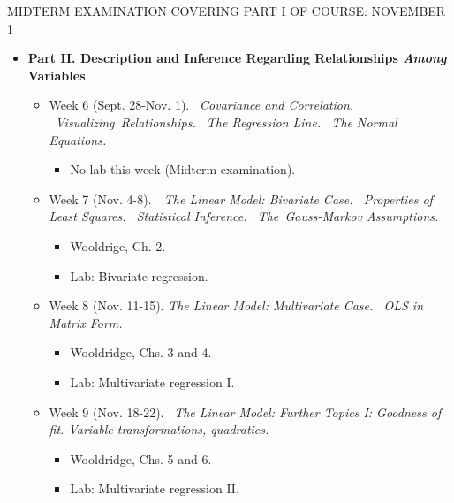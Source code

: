\documentclass[11pt]{article}
\begin{document}
\begin{center}
MIDTERM EXAMINATION COVERING PART I OF COURSE: NOVEMBER 1\bigskip
\end{center}

\begin{itemize}
\item \textbf{Part II. Description and Inference Regarding Relationships 
\textit{Among} Variables}

\begin{itemize}
\item Week 6 (Sept. 28-Nov. 1). \textit{\ Covariance and Correlation. \
Visualizing\ Relationships. \ The Regression Line. \ The Normal Equations.}

\begin{itemize}
\item No lab this week (Midterm examination).\bigskip
\end{itemize}

\item Week 7 (Nov. 4-8).\textit{\ \ The Linear Model: Bivariate Case. \
Properties of Least Squares. \ Statistical Inference. \ The\ Gauss-Markov
Assumptions.}

\begin{itemize}
\item Wooldrige, Ch. 2.

\item Lab: Bivariate regression.\bigskip
\end{itemize}

\item Week 8 (Nov. 11-15). \textit{The Linear Model: Multivariate Case. \
OLS in Matrix Form. \ }

\begin{itemize}
\item Wooldridge, Chs. 3 and 4.

\item Lab: Multivariate regression I.\bigskip
\end{itemize}

\item Week 9 (Nov. 18-22). \ \textit{The Linear Model: Further Topics I:
Goodness of fit. Variable transformations, quadratics.}

\begin{itemize}
\item Wooldridge, Chs. 5 and 6.

\item Lab: Multivariate regression II.\bigskip
\end{itemize}


\end{itemize}
\end{itemize}
\end{document}
